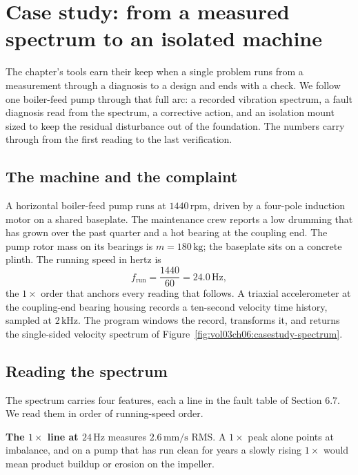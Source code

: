 \section{Case study: from a measured spectrum to an isolated
machine}

The chapter's tools earn their keep when a single problem runs from a
measurement through a diagnosis to a design and ends with a check. We
follow one boiler-feed pump through that full arc: a recorded vibration
spectrum, a fault diagnosis read from the spectrum, a corrective action,
and an isolation mount sized to keep the residual disturbance out of the
foundation. The numbers carry through from the first reading to the last
verification.

\subsection{The machine and the complaint}

A horizontal boiler-feed pump runs at $1440\,\text{rpm}$, driven by a
four-pole induction motor on a shared baseplate. The maintenance crew
reports a low drumming that has grown over the past quarter and a hot
bearing at the coupling end. The pump rotor mass on its bearings is
$m = 180\,\si{\kilogram}$; the baseplate sits on a concrete plinth. The
running speed in hertz is
\[
f_{\text{run}} = \frac{1440}{60} = 24.0\,\si{\hertz},
\]
the $1\times$ order that anchors every reading that follows. A triaxial
accelerometer at the coupling-end bearing housing records a ten-second
velocity time history, sampled at $2\,\si{\kilo\hertz}$. The program
 windows the record, transforms it, and
returns the single-sided velocity spectrum of
Figure~\ref{fig:vol03ch06:casestudy-spectrum}.



\subsection{Reading the spectrum}

The spectrum carries four features, each a line in the fault table of
Section 6.7. We read them in order of running-speed order.

\textbf{The $1\times$ line at $24\,\si{\hertz}$} measures $2.6\,\si{
\milli\meter\per\second}$ RMS. A $1\times$ peak alone points at
imbalance, and on a pump that has run clean for years a slowly rising
$1\times$ would mean product buildup or erosion on the impeller.

